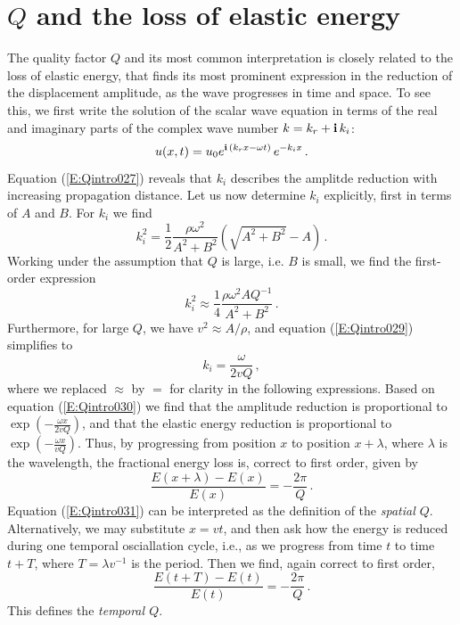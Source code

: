 
\section{$Q$ and the loss of elastic energy}

The quality factor $Q$ and its most common interpretation is closely related to the loss of elastic energy, that finds its most prominent expression in the reduction of the displacement amplitude, as the wave progresses in time and space. To see this, we first write the solution of the scalar wave equation in terms of the real and imaginary parts of the complex wave number $k=k_r+\mathbf{i}\,k_i$:
\begin{equation}\label{E:Qintro027}
u(x,t)=u_0 e^{\mathbf{i}\,(k_r x-\omega t)}\,e^{-k_i x}\,.
\end{equation}
Equation (\ref{E:Qintro027}) reveals that $k_i$ describes the amplitde reduction with increasing propagation distance. Let us now determine $k_i$ explicitly, first in terms of $A$ and $B$. For $k_i$ we find
\begin{equation}\label{E:Qintro028}
k_i^2=\frac{1}{2} \frac{\rho\omega^2}{A^2+B^2}\left( \sqrt{A^2+B^2}-A \right)\,.
\end{equation}
Working under the assumption that $Q$ is large, i.e. $B$ is small, we find the first-order expression
\begin{equation}\label{E:Qintro029}
k_i^2 \approx \frac{1}{4} \frac{\rho\omega^2 A Q^{-1}}{A^2+B^2}\,.
\end{equation}
Furthermore, for large $Q$, we have $v^2\approx A/\rho$, and equation (\ref{E:Qintro029}) simplifies to
\begin{equation}\label{E:Qintro030}
k_i = \frac{\omega}{2vQ}\,,
\end{equation}
where we replaced $\approx$ by $=$ for clarity in the following expressions. Based on equation (\ref{E:Qintro030}) we find that the amplitude reduction is proportional to $\exp\left(-\frac{\omega x}{2vQ}\right)$, and that the elastic energy reduction is proportional to  $\exp\left(-\frac{\omega x}{vQ}\right)$. Thus, by progressing from position $x$ to position $x+\lambda$, where $\lambda$ is the wavelength, the fractional energy loss is, correct to first order, given by
\begin{equation}\label{E:Qintro031}
\frac{E(x+\lambda)-E(x)}{E(x)}=-\frac{2\pi}{Q}\,.
\end{equation}
Equation (\ref{E:Qintro031}) can be interpreted as the definition of the \emph{spatial $Q$}. Alternatively, we may substitute $x=vt$, and then ask how the energy is reduced during one temporal osciallation cycle, i.e., as we progress from time $t$ to time $t+T$, where $T=\lambda v^{-1}$ is the period. Then we find, again correct to first order,
\begin{equation}\label{E:Qintro032}
\frac{E(t+T)-E(t)}{E(t)}=-\frac{2\pi}{Q}\,.
\end{equation}
This defines the \emph{temporal $Q$}.


